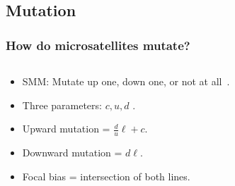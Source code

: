 \documentclass[11pt]{beamer}
\begin{document}
    \subsection{Mutation}\label{subsec:mm}
    \begin{frame}
        \frametitle{How do microsatellites mutate?}
        \begin{columns}
            \begin{column}{0.5\textwidth}
                \begin{itemize}
                    \item SMM: Mutate up one, down one, or not at all~\cite{sainudiinMicrosatelliteMutationModels2004}.
                        \medskip
                    \item Three parameters: $c, u, d$ \medskip.
                    \item Upward mutation = $\frac{d}{u}\ell + c$. \medskip
                    \item Downward mutation = $d\ell$. \medskip
                    \item Focal bias = intersection of both lines.
                \end{itemize}
            \end{column}
            \begin{column}{0.6\textwidth}
                \medskip

                \centering{} \newline
            \end{column}
        \end{columns}
    \end{frame}

\end{document}
